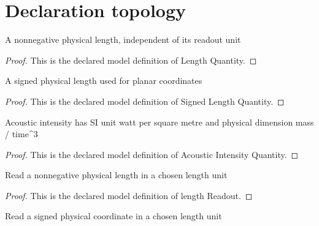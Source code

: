 \section{Declaration topology}
\begin{definition}
  \label{def:physics:phyx-mini-0246:phyxminiproblems-problemphyxmini0246-lengthquantity}
  A nonnegative physical length, independent of its readout unit
\end{definition}
\begin{proof}
  This is the declared model definition of Length Quantity.
\end{proof}
\begin{definition}
  \label{def:physics:phyx-mini-0246:phyxminiproblems-problemphyxmini0246-signedlengthquantity}
  A signed physical length used for planar coordinates
\end{definition}
\begin{proof}
  This is the declared model definition of Signed Length Quantity.
\end{proof}
\begin{definition}
  \label{def:physics:phyx-mini-0246:phyxminiproblems-problemphyxmini0246-acousticintensityquantity}
  Acoustic intensity has SI unit watt per square metre and physical dimension mass / time\textasciicircum{}3
\end{definition}
\begin{proof}
  This is the declared model definition of Acoustic Intensity Quantity.
\end{proof}
\begin{definition}
  \label{def:physics:phyx-mini-0246:phyxminiproblems-problemphyxmini0246-lengthreadout}
  Read a nonnegative physical length in a chosen length unit
\end{definition}
\begin{proof}
  This is the declared model definition of length Readout.
\end{proof}
\begin{definition}
  \label{def:physics:phyx-mini-0246:phyxminiproblems-problemphyxmini0246-signedlengthreadout}
  Read a signed physical coordinate in a chosen length unit
\end{definition}
